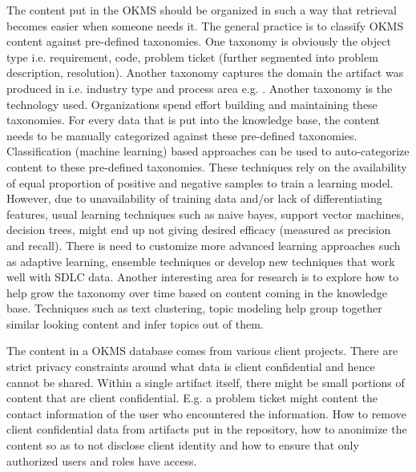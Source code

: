 The content put in the OKMS should be organized in such a way that retrieval becomes easier when someone needs it. The general practice is to classify OKMS content against pre-defined taxonomies. One taxonomy is obviously the object type i.e. requirement, code, problem ticket (further segmented into problem description, resolution). Another taxonomy captures the domain the artifact was produced in i.e. industry type and process area e.g. \cite{apqc,bph}. Another taxonomy is the technology used. Organizations spend effort building and maintaining these taxonomies. For every data that is put into the knowledge base, the content needs to be manually categorized against these pre-defined taxonomies. Classification (machine learning) based approaches can be used to auto-categorize content to these pre-defined taxonomies. These techniques rely on the availability of equal proportion of positive and negative samples to train a learning model. However, due to unavailability of training data and/or lack of differentiating features, usual learning techniques such as naive bayes, support vector machines, decision trees, might end up not giving desired efficacy (measured as precision and recall). There is need to customize more advanced learning approaches such as adaptive learning, ensemble techniques or develop new techniques that work well with SDLC data. Another interesting area for research is to explore how to help grow the taxonomy over time based on content coming in the knowledge base. Techniques such as text clustering, topic modeling \cite{} help group together similar looking content and infer topics out of them. 

The content in a OKMS database comes from various client projects. There are strict privacy constraints around what data is client confidential and hence cannot be shared. Within a single artifact itself, there might be small portions of content that are client confidential. E.g. a problem ticket might content the contact information of the user who encountered the information. How to remove client confidential data from artifacts put in the repository, how to anonimize the content so as to not disclose client identity and how to ensure that only authorized users and roles have access.

